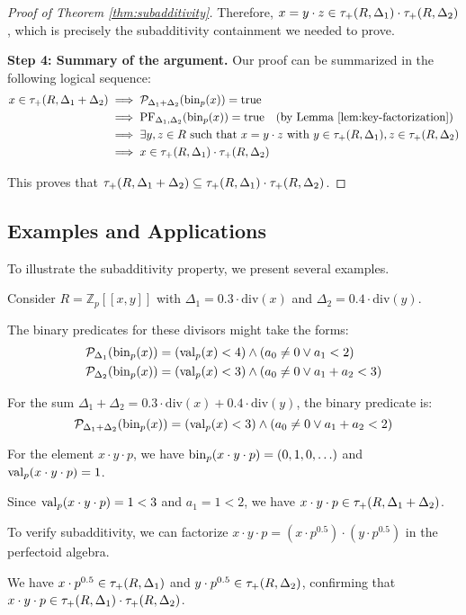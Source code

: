 \begin{proof}[Proof of Theorem \ref{thm:subadditivity}]
Therefore, $x = y \cdot z \in \tau_+(R,\Delta_1) \cdot \tau_+(R,\Delta_2)$, which is precisely the subadditivity containment we needed to prove.

\textbf{Step 4: Summary of the argument.}
Our proof can be summarized in the following logical sequence:
\begin{align*}
x \in \tau_+(R,\Delta_1+\Delta_2) &\implies \mathcal{P}_{\Delta_1+\Delta_2}(\operatorname{bin}_p(x)) = \text{true} \\
&\implies \text{PF}_{\Delta_1, \Delta_2}(\operatorname{bin}_p(x)) = \text{true} \quad \text{(by Lemma \ref{lem:key-factorization})} \\
&\implies \exists y, z \in R \text{ such that } x = y \cdot z \text{ with } y \in \tau_+(R,\Delta_1), z \in \tau_+(R,\Delta_2) \\
&\implies x \in \tau_+(R,\Delta_1) \cdot \tau_+(R,\Delta_2)
\end{align*}

This proves that $\tau_+(R,\Delta_1+\Delta_2) \subseteq \tau_+(R,\Delta_1) \cdot \tau_+(R,\Delta_2)$.
\end{proof}

\subsection{Examples and Applications}

To illustrate the subadditivity property, we present several examples.

\begin{example}\label{ex:subadditivity-simple}
Consider $R = \mathbb{Z}_p[[x,y]]$ with $\Delta_1 = 0.3 \cdot \text{div}(x)$ and $\Delta_2 = 0.4 \cdot \text{div}(y)$.

The binary predicates for these divisors might take the forms:
\begin{align*}
\mathcal{P}_{\Delta_1}(\operatorname{bin}_p(x)) &= (\operatorname{val}_p(x) < 4) \wedge (a_0 \neq 0 \vee a_1 < 2) \\
\mathcal{P}_{\Delta_2}(\operatorname{bin}_p(x)) &= (\operatorname{val}_p(x) < 3) \wedge (a_0 \neq 0 \vee a_1 + a_2 < 3)
\end{align*}

For the sum $\Delta_1 + \Delta_2 = 0.3 \cdot \text{div}(x) + 0.4 \cdot \text{div}(y)$, the binary predicate is:
$$\mathcal{P}_{\Delta_1+\Delta_2}(\operatorname{bin}_p(x)) = (\operatorname{val}_p(x) < 3) \wedge (a_0 \neq 0 \vee a_1 + a_2 < 2)$$

For the element $x \cdot y \cdot p$, we have $\operatorname{bin}_p(x \cdot y \cdot p) = (0,1,0,\ldots)$ and $\operatorname{val}_p(x \cdot y \cdot p) = 1$.

Since $\operatorname{val}_p(x \cdot y \cdot p) = 1 < 3$ and $a_1 = 1 < 2$, we have $x \cdot y \cdot p \in \tau_+(R,\Delta_1+\Delta_2)$.

To verify subadditivity, we can factorize $x \cdot y \cdot p = (x \cdot p^{0.5}) \cdot (y \cdot p^{0.5})$ in the perfectoid algebra.

We have $x \cdot p^{0.5} \in \tau_+(R,\Delta_1)$ and $y \cdot p^{0.5} \in \tau_+(R,\Delta_2)$, confirming that $x \cdot y \cdot p \in \tau_+(R,\Delta_1) \cdot \tau_+(R,\Delta_2)$.
\end{example}

